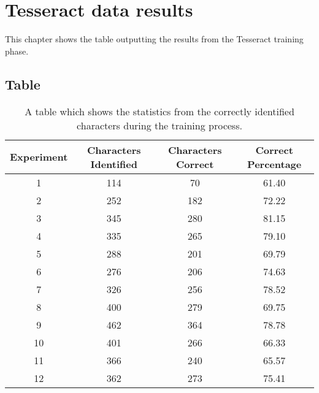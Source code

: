 \chapter{Tesseract data results}
\label{appendix:tesseract}
This chapter shows the table outputting the results from the Tesseract training phase.

\section{Table}
\label{appendix:tesseract_table}

\begin{table}[h!]
\centering
 \begin{tabular}{||c c c c||}
 \hline
 Experiment & Characters Identified & Characters Correct & Correct Percentage \\ [0.5ex]
 \hline\hline
 1 & 114 & 70  & 61.40 \\
 2 & 252 & 182 & 72.22 \\
 3 & 345 & 280 & 81.15 \\
 4 & 335 & 265 & 79.10 \\
 5 & 288 & 201 & 69.79 \\
 6 & 276 & 206 & 74.63 \\
 7 & 326 & 256 & 78.52 \\
 8 & 400 & 279 & 69.75 \\
 9 & 462 & 364 & 78.78 \\
 10 & 401 & 266 & 66.33 \\
 11 & 366 & 240 & 65.57 \\
 12 & 362 & 273 & 75.41 \\ [1ex]
 \hline
 \end{tabular}
 \caption{A table which shows the statistics from the correctly identified characters during the training process.}
\end{table}
